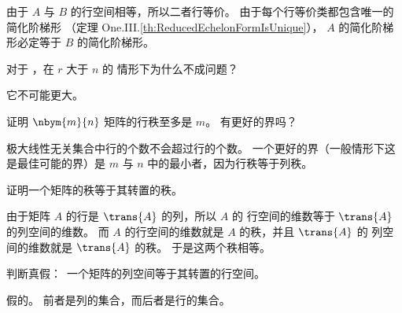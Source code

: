 \begin{exercises}
\begin{answer}
\begin{exparts}
          由于 \( A \) 与 \( B \) 的行空间相等，所以二者行等价。
          由于每个行等价类都包含唯一的简化阶梯形
          （定理 One.III.\ref{th:ReducedEchelonFormIsUnique}），
          \( A \) 的简化阶梯形必定等于 \( B \) 的简化阶梯形。
      \end{exparts}
    \end{answer}
  \item
    对于 ，在 \( r \) 大于 \( n \) 的
    情形下为什么不成问题？
    \begin{answer}
      它不可能更大。
    \end{answer}
  \item
    证明 \( \nbym{m}{n} \) 矩阵的行秩至多是 \( m \)。
    有更好的界吗？
    \begin{answer}
      极大线性无关集合中行的个数不会超过行的个数。
      一个更好的界（一般情形下这是最佳可能的界）是 \( m \) 与 \( n \)
      中的最小者，因为行秩等于列秩。
     \end{answer}
  \item
    证明一个矩阵的秩等于其转置的秩。
    \begin{answer}
      由于矩阵 \( A \) 的行是 \( \trans{A} \) 的列，所以 \( A \) 的
      行空间的维数等于 \( \trans{A} \) 的列空间的维数。
      而 \( A \) 的行空间的维数就是 \( A \) 的秩，并且 \( \trans{A} \) 的
      列空间的维数就是 \( \trans{A} \) 的秩。
      于是这两个秩相等。
    \end{answer}
  \item
    判断真假：~一个矩阵的列空间等于其转置的行空间。
    \begin{answer}
      假的。
      前者是列的集合，而后者是行的集合。


\end{answer}
\end{exercises}
